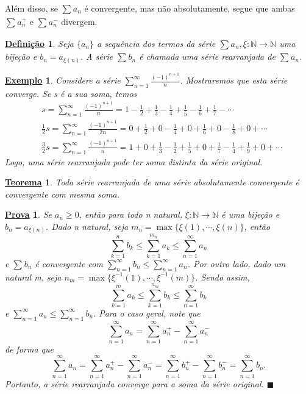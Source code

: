 \documentclass{article}
\newtheorem*{def*}{\underline{Defini\c c\~ao}}
\newtheorem*{theorem*}{\underline{Teorema}}
\newtheorem{example}{\underline{Exemplo}}
\newtheorem*{proof*}{\underline{Prova}}
\renewcommand\qedsymbol{$\blacksquare$}
\begin{document}
 Al\'em disso, se $\sum\limits_{}^{}a_{n}$ \'e convergente, mas n\~ao absolutamente, segue que ambas $\sum\limits_{}^{}a_{n}^{+}$ e $\sum\limits_{}^{}a_{n}^{-}$ divergem.
\begin{def*}
  Seja $\{a_{n}\}$ a sequ\^encia dos termos da s\'erie $\sum\limits_{}^{}a_{n}, \xi:\mathbb{N}\rightarrow \mathbb{N}$
uma bije\c c\~ao e $b_{n} = a_{\xi(n)}.$ A s\'erie $\sum\limits_{}^{}b_{n}$ \'e chamada uma s\'erie rearranjada de $\sum\limits_{}^{}a_{n}.$
\end{def*}
\begin{example}
  Considere a s\'erie $\sum\limits_{n=1}^{\infty}\frac{(-1)^{n+1}}{n}$. Mostraremos que esta s\'erie converge. Se s \'e a sua soma, temos 
 \begin{align*}
   &s = \sum\limits_{n=1}^{\infty}\frac{(-1)^{n+1}}{n} = 1 - \frac{1}{2} + \frac{1}{3} - \frac{1}{4} + \frac{1}{5} - \frac{1}{6} + \frac{1}{7} -\cdots\\
   &\frac{1}{2}s = \sum\limits_{n=1}^{\infty}\frac{(-1)^{n+1}}{2n} = 0 + \frac{1}{2} + 0 - \frac{1}{4} + 0 + \frac{1}{6} + 0 - \frac{1}{8} + 0 + \cdots\\
   &\frac{3}{2}s = \sum\limits_{n=1}^{\infty}\frac{(-1)^{n+1}}{n} = 1 + 0 + \frac{1}{3} - \frac{1}{2} + \frac{1}{5} + 0 + \frac{1}{7}-\frac{1}{4}+\frac{1}{9}+0+\cdots
 \end{align*}
 Logo, uma s\'erie rearranjada pode ter soma distinta da s\'erie original. 
\end{example}
\begin{theorem*}
  Toda s\'erie rearranjada de uma s\'erie absolutamente convergente \'e convergente com mesma soma.
\end{theorem*}
\begin{proof*}
  Se $a_{n}\geq{}0$, ent\~ao para todo n natural, $\xi:\mathbb{N}\rightarrow \mathbb{N}$ \'e uma bije\c c\~ao e $b_{n} = a_{\xi(n)}$.
  Dado n natural, seja $m_{n} = \max{\{\xi(1), \cdots, \xi(n)\}}$, ent\~ao 
    $$
      \sum\limits_{k=1}^{n}b_{k} \leq{\sum\limits_{k=1}^{m_{n}}a_{k}\leq{\sum\limits_{n=1}^{\infty}a_{n}}}
    $$
  e $\sum\limits_{}^{}b_{n}$ \'e convergente com $\sum\limits_{n=1}^{\infty}b_{n}\leq{\sum\limits_{n=1}^{\infty}a_{n}}$. Por outro lado,
  dado um natural m, seja $n_{m}=\max{\{\xi^{-1}(1), \cdots, \xi^{-1}(m)\}}$. Sendo assim, 
    $$
      \sum\limits_{k=1}^{m}a_{k}\leq{\sum\limits_{k=1}^{n_{m}}b_{k}\leq{\sum\limits_{n=1}^{\infty}b_{k}}}
    $$
  e $\sum\limits_{n=1}^{\infty}a_{n}\leq{\sum\limits_{n=1}^{\infty}b_{n}.}$ Para o caso geral, note que 
    $$
      \sum\limits_{n=1}^{\infty}a_{n} = \sum\limits_{n=1}^{\infty}a_{n}^{+} - \sum\limits_{n=1}^{\infty}a_{n}^{-}
    $$
  de forma que 
    $$
      \sum\limits_{n=1}^{\infty}a_{n} = \sum\limits_{n=1}^{\infty}a_{n}^{+} - \sum\limits_{n=1}^{\infty}a_{n}^{-} = \sum\limits_{n=1}^{\infty}b_{n}^{+}-\sum\limits_{n=1}^{\infty}b_{n}^{-} = \sum\limits_{n=1}^{\infty}b_{n}.
    $$
  Portanto, a s\'erie rearranjada converge para a soma da s\'erie original. \qedsymbol
\end{proof*}
\end{document}
